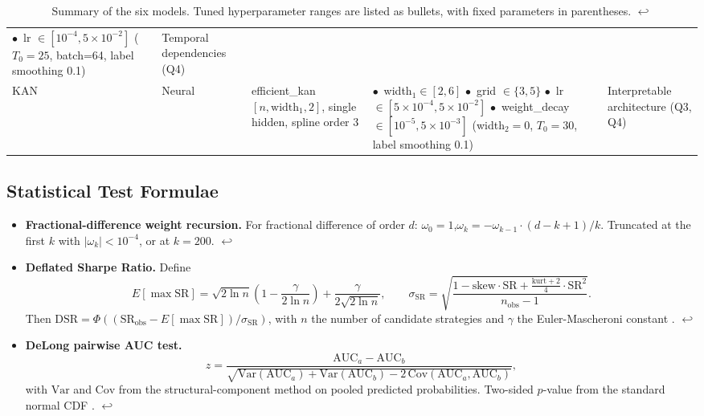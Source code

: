 \documentclass[11pt,a4paper,oneside]{article}
\begin{document}
\begin{table}[H]
\begin{tabular}{p{1.5cm}p{1.5cm}p{2.4cm}p{5.4cm}p{1.9cm}}
$\bullet$\ lr $\in [10^{-4}, 5 \times 10^{-2}]$ \newline
($T_0=25$, batch=64, label smoothing 0.1)
& Temporal dependencies (Q4) \\
KAN & Neural & efficient\_kan $[n, \text{width}_1, 2]$, single hidden, spline order 3 &
$\bullet$\ width$_1 \in [2, 6]$ \newline
$\bullet$\ grid $\in \{3, 5\}$ \newline
$\bullet$\ lr $\in [5 \times 10^{-4}, 5 \times 10^{-2}]$ \newline
$\bullet$\ weight\_decay $\in [10^{-5}, 5 \times 10^{-3}]$ \newline
(width$_2=0$, $T_0=30$, label smoothing 0.1)
& Interpretable architecture (Q3, Q4) \\
\bottomrule
\end{tabular}
\caption{Summary of the six models. Tuned hyperparameter ranges are listed as bullets, with fixed parameters in parentheses. \hyperref[ref:model_summary_call]{$\hookleftarrow$}}
\label{tab:model_summary}
\end{table}


\newpage
\subsection{Statistical Test Formulae}\label{app:math}
\setlength{\abovedisplayskip}{4pt}
\setlength{\belowdisplayskip}{4pt}

\begin{itemize}\itemsep=3pt
\item \textbf{Fractional-difference weight recursion.}\label{app:ffd_weights} For fractional difference of order $d$: $\omega_0 = 1$,\newline $\omega_k = -\omega_{k-1} \cdot (d - k + 1)/k$. Truncated at the first $k$ with $|\omega_k| < 10^{-4}$, or at $k = 200$. \hyperref[ref:ffd_weights_call]{$\hookleftarrow$}

\item \textbf{Deflated Sharpe Ratio.}\label{app:dsr_formula} Define
\[
E[\max \text{SR}] = \sqrt{2 \ln n}\!\left(1 - \frac{\gamma}{2 \ln n}\right) + \frac{\gamma}{2\sqrt{2 \ln n}}, \qquad
\sigma_{\text{SR}} = \sqrt{\frac{1 - \text{skew} \cdot \text{SR} + \tfrac{\text{kurt} + 2}{4} \cdot \text{SR}^2}{n_{\text{obs}} - 1}}.
\]
Then $\text{DSR} = \Phi\!\left((\text{SR}_{\text{obs}} - E[\max\text{SR}])/\sigma_{\text{SR}}\right)$, with $n$ the number of candidate strategies and $\gamma$ the Euler-Mascheroni constant \citep[Chapter 11]{lopez_de_prado_2018}. \hyperref[ref:dsr_formula_call]{$\hookleftarrow$}

\item \textbf{DeLong pairwise AUC test.}\label{app:delong_formula}
\[
z = \frac{\text{AUC}_a - \text{AUC}_b}{\sqrt{\text{Var}(\text{AUC}_a) + \text{Var}(\text{AUC}_b) - 2 \, \text{Cov}(\text{AUC}_a, \text{AUC}_b)}},
\]
with $\text{Var}$ and $\text{Cov}$ from the structural-component method on pooled predicted probabilities. Two-sided $p$-value from the standard normal CDF \citep{delong_1988}. \hyperref[ref:delong_formula_call]{$\hookleftarrow$}
\end{itemize}
\end{document}
